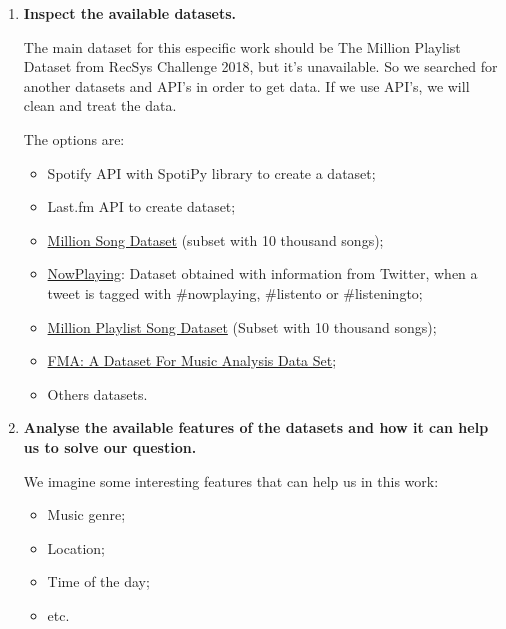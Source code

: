 \documentclass{article}
\begin{document}
    \begin{enumerate}
        \item \textbf{Inspect the available datasets.}
        
            The main dataset for this especific work should be The Million
            Playlist Dataset from RecSys Challenge 2018, but it's unavailable.
            So we searched for another datasets and API's in order to get data.
            If we use API's, we will clean and treat the data.
        
            The options are:

            \begin{itemize}
                \item Spotify API with SpotiPy library to create a dataset;
                \item Last.fm API to create dataset;
                \item \href{http://millionsongdataset.com/}{Million Song Dataset}
                (subset with 10 thousand songs);
                \item \href{https://dbis.uibk.ac.at/node/263}{NowPlaying}:
                Dataset obtained with information from Twitter, when a tweet is tagged with \#nowplaying, \#listento or \#listeningto;
                \item \href{https://github.com/felipevieira/computacao-e-musica-lsd/blob/master/sbcm-2017/Datasets/MPSD%20v1.0.csv}{Million Playlist Song Dataset}
                (Subset with 10 thousand songs);
                \item \href{https://github.com/mdeff/fma}{FMA:
                A Dataset For Music Analysis Data Set};
                \item Others datasets.
            \end{itemize}

        \item \textbf{Analyse the available features of the datasets and how it
        can help us to solve our question.}
        
            We imagine some interesting features that can help us in this work:

            \begin{itemize}
                \item Music genre;
                \item Location;
                \item Time of the day;
                \item etc.
            \end{itemize}


\end{enumerate}
\end{document}

